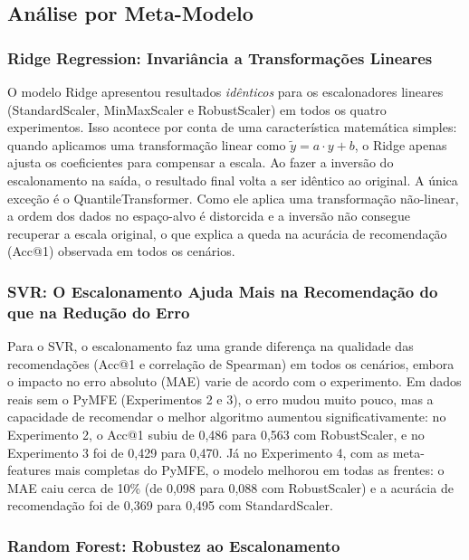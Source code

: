 \documentclass[12pt]{article}
\begin{document}
\subsection{Análise por Meta-Modelo}

\subsubsection{Ridge Regression: Invariância a Transformações Lineares}

O modelo Ridge apresentou resultados \textit{idênticos} para os escalonadores lineares (StandardScaler, MinMaxScaler e RobustScaler) em todos os quatro experimentos. Isso acontece por conta de uma característica matemática simples: quando aplicamos uma transformação linear como $\tilde{y} = a \cdot y + b$, o Ridge apenas ajusta os coeficientes para compensar a escala. Ao fazer a inversão do escalonamento na saída, o resultado final volta a ser idêntico ao original. A única exceção é o QuantileTransformer. Como ele aplica uma transformação não-linear, a ordem dos dados no espaço-alvo é distorcida e a inversão não consegue recuperar a escala original, o que explica a queda na acurácia de recomendação (Acc@1) observada em todos os cenários.

\subsubsection{SVR: O Escalonamento Ajuda Mais na Recomendação do que na Redução do Erro}

Para o SVR, o escalonamento faz uma grande diferença na qualidade das recomendações (Acc@1 e correlação de Spearman) em todos os cenários, embora o impacto no erro absoluto (MAE) varie de acordo com o experimento. Em dados reais sem o PyMFE (Experimentos 2 e 3), o erro mudou muito pouco, mas a capacidade de recomendar o melhor algoritmo aumentou significativamente: no Experimento 2, o Acc@1 subiu de 0,486 para 0,563 com RobustScaler, e no Experimento 3 foi de 0,429 para 0,470. Já no Experimento 4, com as meta-features mais completas do PyMFE, o modelo melhorou em todas as frentes: o MAE caiu cerca de 10\% (de 0,098 para 0,088 com RobustScaler) e a acurácia de recomendação foi de 0,369 para 0,495 com StandardScaler. 

\subsubsection{Random Forest: Robustez ao Escalonamento}
\end{document}
